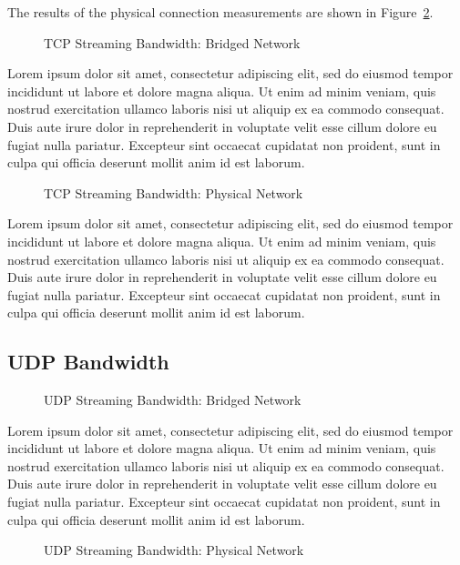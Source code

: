 The results of the physical connection measurements are shown in Figure~\ref{fig:tcp_stream_phys}.
\begin{figure}
    \centering
    \def\svgwidth{\columnwidth}
    
    \caption{TCP Streaming Bandwidth: Bridged Network}
    \label{fig:tcp_stream_bridge}
\end{figure}
Lorem ipsum dolor sit amet, consectetur adipiscing elit, sed do eiusmod tempor incididunt ut labore et dolore magna aliqua. Ut enim ad minim veniam, quis nostrud exercitation ullamco laboris nisi ut aliquip ex ea commodo consequat. Duis aute irure dolor in reprehenderit in voluptate velit esse cillum dolore eu fugiat nulla pariatur. Excepteur sint occaecat cupidatat non proident, sunt in culpa qui officia deserunt mollit anim id est laborum.
\begin{figure}
    \centering
    \def\svgwidth{\columnwidth}
    
    \caption{TCP Streaming Bandwidth: Physical Network}
    \label{fig:tcp_stream_phys}
\end{figure}
Lorem ipsum dolor sit amet, consectetur adipiscing elit, sed do eiusmod tempor incididunt ut labore et dolore magna aliqua. Ut enim ad minim veniam, quis nostrud exercitation ullamco laboris nisi ut aliquip ex ea commodo consequat. Duis aute irure dolor in reprehenderit in voluptate velit esse cillum dolore eu fugiat nulla pariatur. Excepteur sint occaecat cupidatat non proident, sunt in culpa qui officia deserunt mollit anim id est laborum.

\subsection{UDP Bandwidth} %
\label{sub:udpbandwidth}
\begin{figure}
    \centering
    \def\svgwidth{\columnwidth}
    
    \caption{UDP Streaming Bandwidth: Bridged Network}
    \label{fig:udp_stream_bridge}
\end{figure}
Lorem ipsum dolor sit amet, consectetur adipiscing elit, sed do eiusmod tempor incididunt ut labore et dolore magna aliqua. Ut enim ad minim veniam, quis nostrud exercitation ullamco laboris nisi ut aliquip ex ea commodo consequat. Duis aute irure dolor in reprehenderit in voluptate velit esse cillum dolore eu fugiat nulla pariatur. Excepteur sint occaecat cupidatat non proident, sunt in culpa qui officia deserunt mollit anim id est laborum.
\begin{figure}
    \centering
    \def\svgwidth{\columnwidth}
    
    \caption{UDP Streaming Bandwidth: Physical Network}
    \label{fig:udp_stream_phys}
\end{figure}

